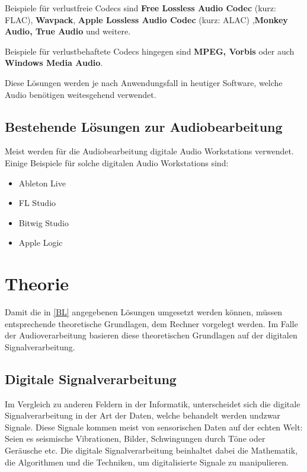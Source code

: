 \documentclass[paper=a4,fontsize=12pt,ngerman]{scrartcl}
\begin{document}
Beispiele für verlustfreie Codecs sind \textbf{Free Lossless Audio Codec} (kurz: FLAC), \textbf{Wavpack}, \textbf{Apple Lossless Audio Codec} (kurz: ALAC) ,\textbf{Monkey Audio, True Audio} und weitere. \cite{gzmk}

Beispiele für verlustbehaftete Codecs hingegen sind \textbf{MPEG, Vorbis} oder auch \textbf{Windows Media Audio}.

Diese Lösungen werden je nach Anwendungsfall in heutiger Software, welche Audio benötigen weitesgehend verwendet.

\subsection{Bestehende Lösungen zur Audiobearbeitung}

Meist werden für die Audiobearbeitung digitale Audio Workstations verwendet. 
Einige Beispiele für solche digitalen Audio Workstations sind:

\begin{itemize}
    \item Ableton Live
    \item FL Studio
    \item Bitwig Studio
    \item Apple Logic
\end{itemize}

\section{Theorie}

Damit die in \ref{BL} angegebenen Lösungen umgesetzt werden können, müssen entsprechende theoretische Grundlagen, dem Rechner vorgelegt werden.
Im Falle der Audioverarbeitung basieren diese theoretischen Grundlagen auf der digitalen Signalverarbeitung.

\subsection{Digitale Signalverarbeitung}

Im Vergleich zu anderen Feldern in der Informatik, unterscheidet sich die digitale Signalverarbeitung in der Art der Daten, welche behandelt werden undzwar Signale. 
Diese Signale kommen meist von sensorischen Daten auf der echten Welt: Seien es seismische Vibrationen, Bilder, Schwingungen durch Töne oder Geräusche etc. Die digitale Signalverarbeitung beinhaltet dabei 
die Mathematik, die Algorithmen und die Techniken, um digitalisierte Signale zu manipulieren. \cite{sws1}
\end{document}
